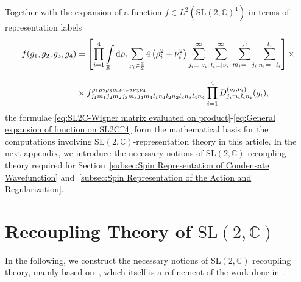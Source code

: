 \documentclass[11pt,a4paper]{article}
\newcommand{\R}{\mathbb R}
\newcommand{\C}{\mathbb C}
\newcommand{\SL}{\text{SL$(2,\C)$}}
\begin{document}
Together with the expansion of a function $f\in L^2\left(\SL^4\right)$ in terms of representation labels
%
\begin{equation}\label{eq:General expansion of function on SL2C^4}
\begin{aligned}
f(g_1 ,g_2 ,g_3 ,g_4)
& =
\left[\prod_{i=1}^4 \int\displaylimits_{\R}\dd{\rho_i}\sum_{\nu_i\in\frac{\mathbb{Z}}{2}}4\left(\rho_i^2+\nu_i^2\right)\sum_{j_i = \abs{\nu_i}}^{\infty}\sum_{l_i = \abs{\nu_i}}^{\infty}\sum_{m_i = - j_i}^{j_i}\sum_{n_i = -l_i}^{l_i}\right]\times\\[7pt]
& \times f^{\rho_1 \rho_2 \rho_3 \rho_4 \nu_1 \nu_2 \nu_3 \nu_4}_{j_1 m_1 j_2 m_2 j_3 m_3 j_4 m_4 l_1 n_1 l_2 n_2 l_3 n_3 l_4 n_4}\prod_{i=1}^4 D^{(\rho_i,\nu_i)}_{j_i m_i l_i n_i}(g_i),
\end{aligned}
\end{equation}
%
the formulae \eqref{eq:SL2C-Wigner matrix evaluated on product}-\eqref{eq:General expansion of function on SL2C^4} form the mathematical basis for the computations involving $\SL$-representation theory in this article. In the next appendix, we introduce the necessary notions of $\SL$-recoupling theory required for Section~\ref{subsec:Spin Representation of Condensate Wavefunction} and~\ref{subsec:Spin Representation of the Action and Regularization}.

\section{Recoupling Theory of $\SL$}\label{appendix:Recoupling Theory of SL2C}

In the following, we construct the necessary notions of $\SL$ recoupling theory, mainly based on~\cite{Speziale:2016axj}, which itself is a refinement of the work done in~\cite{Ruehl1970,Naimark1964,Anderson1970,Anderson1970a,Kerimov1978}.
\end{document}
